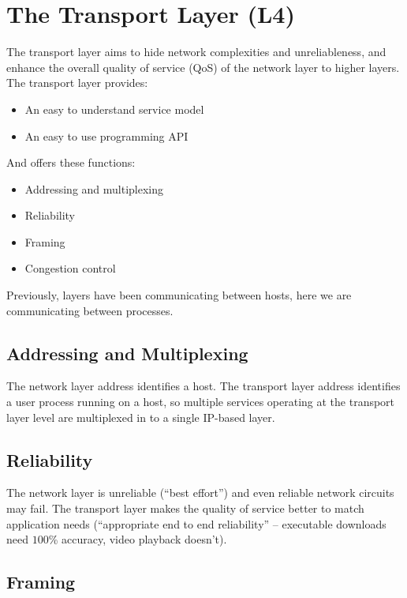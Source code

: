 \section{The Transport Layer (L4)}\label{sec:the_transport_layer_l4_}

The transport layer aims to hide network complexities and unreliableness, and enhance the overall quality of service (QoS) of the network layer to higher layers.
The transport layer provides:
\begin{itemize}
    \item An easy to understand service model
    \item An easy to use programming API
\end{itemize}
And offers these functions:
\begin{itemize}
    \item Addressing and multiplexing
    \item Reliability
    \item Framing
    \item Congestion control
\end{itemize}

\begin{note}
    Previously, layers have been communicating between hosts, here we are communicating between processes.
\end{note}

\subsection{Addressing and Multiplexing}\label{sub:addressing_and_multiplexing}

The network layer address identifies a host.
The transport layer address identifies a user process running on a host, so multiple services operating at the transport layer level are multiplexed in to a single IP-based layer.

\subsection{Reliability}\label{sub:reliability}

The network layer is unreliable (``best effort'') and even reliable network circuits may fail.
The transport layer makes the quality of service better to match application needs (``appropriate end to end reliability'' -- executable downloads need \(100\)\% accuracy, video playback doesn't).

\subsection{Framing}\label{sub:framing}


